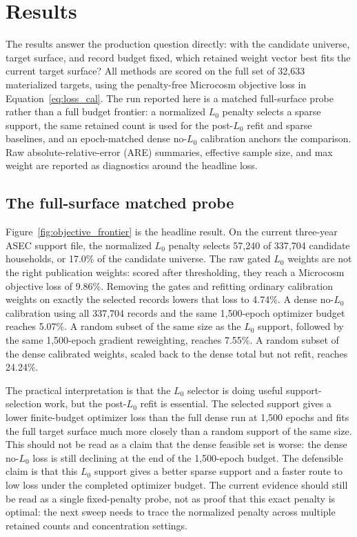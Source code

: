 \section{Results}
\label{sec:results}

The results answer the production question directly: with the candidate universe, target surface, and
record budget fixed, which retained weight vector best fits the current \microcosm{} target surface? All
methods are scored on the full set of 32{,}633 materialized targets, using the penalty-free Microcosm
objective loss in Equation~\ref{eq:loss_cal}. The run reported here is a matched full-surface probe rather
than a full budget frontier: a normalized $L_0$ penalty selects a sparse support, the same retained count
is used for the post-$L_0$ refit and sparse baselines, and an epoch-matched dense no-$L_0$ calibration
anchors the comparison. Raw absolute-relative-error (ARE) summaries, effective sample size, and max weight
are reported as diagnostics around the headline loss.

\subsection{The full-surface matched probe}

Figure~\ref{fig:objective_frontier} is the headline result. On the current three-year ASEC support file,
the normalized $L_0$ penalty selects 57{,}240 of 337{,}704 candidate households, or 17.0\% of the
candidate universe. The raw gated $L_0$ weights are not the right publication weights: scored after
thresholding, they reach a Microcosm objective loss of 9.86\%. Removing the gates and refitting ordinary
calibration weights on exactly the selected records lowers that loss to 4.74\%. A dense no-$L_0$
calibration using all 337{,}704 records and the same 1{,}500-epoch optimizer budget reaches 5.07\%. A
random subset of the same size as the $L_0$ support, followed by the same 1{,}500-epoch gradient
reweighting, reaches 7.55\%. A random subset of the dense calibrated weights, scaled back to the dense
total but not refit, reaches 24.24\%.

The practical interpretation is that the $L_0$ selector is doing useful support-selection work, but the
post-$L_0$ refit is essential. The selected support gives a lower finite-budget optimizer loss than
the full dense run at 1{,}500 epochs and fits the full target surface much more closely than a random
support of the same size. This should not be read as a claim that the dense feasible set is worse: the
dense no-$L_0$ loss is still declining at the end of the 1{,}500-epoch budget. The defensible claim is that
this $L_0$ support gives a better sparse support and a faster route to low loss under the completed
optimizer budget. The current evidence should still be read as a single fixed-penalty probe, not as proof
that this exact penalty is optimal: the next sweep needs to trace the normalized penalty across multiple
retained counts and concentration settings.

